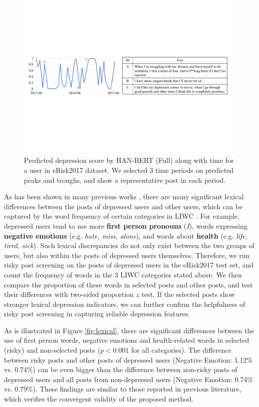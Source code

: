 \begin{figure}[t]
    \centering
    \includegraphics[width=2\columnwidth]{figures/curve.pdf}
    \caption{Predicted depression score by HAN-BERT (Full) along with time for a user in eRisk2017 dataset. We selected 3 time periods on predicted peaks and troughs, and show a representative post in each period.}
    \label{fig:curve}
\end{figure}

As has been shown in many previous works \citep{shen2017depression, eichstaedt2018facebook, wolohan2018detecting}, there are many significant lexical differences between the posts of depressed users and other users, which can be captured by the word frequency of certain categories in LIWC \citep{pennebaker2001linguistic}. For example, depressed users tend to use more \textbf{first person pronouns} (\textit{I}), words expressing \textbf{negative emotions} (e.g. \textit{hate, miss, alone}), and words about \textbf{health} (e.g. \textit{life, tired, sick}). Such lexical discrepancies do not only exist between the two groups of users, but also within the posts of depressed users themselves. Therefore, we run risky post screening on the posts of depressed users in the eRisk2017 test set, and count the frequency of words in the 3 LIWC categories stated above. We then compare the proportion of these words in selected posts and other posts, and test their differences with two-sided proportion $z$ test. If the selected posts show stronger lexical depression indicators, we can further confirm the helpfulness of risky post screening in capturing reliable depression features.

As is illustrated in Figure \ref{fig:lexical}, there are significant differences between the use of first person words, negative emotions and health-related words in selected (risky) and non-selected posts ($p < 0.001$ for all categories). The difference between risky posts and other posts of depressed users (Negative Emotion: 1.12\% vs. 0.74\%) can be even bigger than the difference between non-risky posts of depressed users and all posts from non-depressed users (Negative Emotion: 0.74\% vs. 0.79\%). These findings are similar to those reported in previous literature, which verifies the convergent validity of the proposed method.

